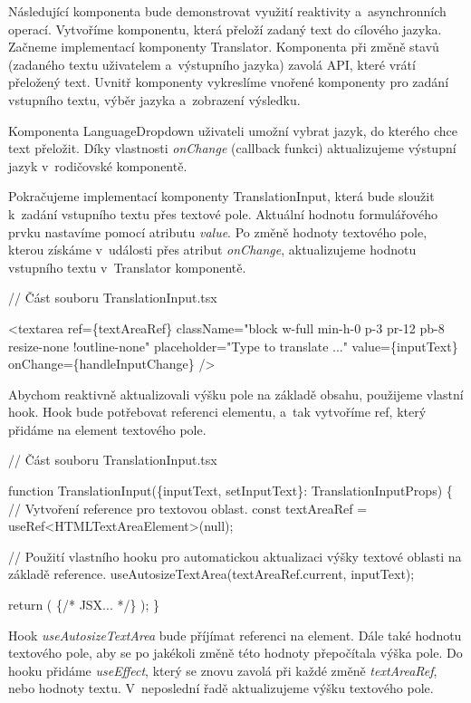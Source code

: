 Následující komponenta bude demonstrovat využití reaktivity a~asynchronních operací. Vytvoříme komponentu, která přeloží zadaný text do cílového jazyka. 
Začneme implementací komponenty Translator. Komponenta při změně stavů (zadaného textu uživatelem a~výstupního jazyka) zavolá API, které vrátí přeložený text.
Uvnitř komponenty vykreslíme vnořené komponenty pro zadání vstupního textu, výběr jazyka a~zobrazení výsledku.

Komponenta LanguageDropdown uživateli umožní vybrat jazyk, do kterého chce text přeložit. 
Díky vlastnosti \emph{onChange} (callback funkci) aktualizujeme výstupní jazyk v~rodičovské komponentě. 

Pokračujeme implementací komponenty TranslationInput, která bude sloužit k~zadání vstupního textu přes textové pole. Aktuální hodnotu formulářového prvku nastavíme pomocí atributu \emph{value}.
Po změně hodnoty textového pole, kterou získáme v~události přes atribut \emph{onChange}, aktualizujeme hodnotu vstupního textu v~Translator komponentě.

\begin{prog}
// Část souboru TranslationInput.tsx

<textarea
  ref=\{textAreaRef\}
  className="block w-full min-h-0 p-3 pr-12 pb-8 resize-none !outline-none"
  placeholder="Type to translate ..."
  value=\{inputText\}
  onChange=\{handleInputChange\}
/>
\end{prog}

Abychom reaktivně aktualizovali výšku pole na základě obsahu, použijeme vlastní hook. 
Hook bude potřebovat referenci elementu, a~tak vytvoříme ref, který přidáme na element textového pole.

\begin{prog}
// Část souboru TranslationInput.tsx

function TranslationInput(\{inputText, setInputText\}: TranslationInputProps) \{
  // Vytvoření reference pro textovou oblast.
  const textAreaRef = useRef<HTMLTextAreaElement>(null);

  // Použití vlastního hooku pro automatickou aktualizaci výšky
    textové oblasti na základě reference.
  useAutosizeTextArea(textAreaRef.current, inputText);

  return (
    \{/* JSX... */\}
  );
\}
\end{prog}

Hook \emph{useAutosizeTextArea} bude příjímat referenci na element. Dále také hodnotu textového pole, aby se po jakékoli změně této hodnoty přepočítala výška pole. 
Do hooku přidáme \emph{useEffect}, který se znovu zavolá při každé změně \emph{textAreaRef}, nebo hodnoty textu. V~neposlední řadě aktualizujeme výšku textového pole.

